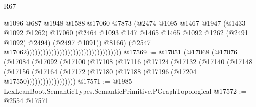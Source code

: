 \begin{lexlean}{R67}
\begin{coremodule}
                                                                          @1096
                                                                          @687
                                                                          @1948
                                                                          @1588
                                                                          @17060
                                                                          @7873
                                                                          (@2474
                                                                            @1095
                                                                            @1467
                                                                            @1947
                                                                            (@1433 @1092 @1262)
                                                                            @17060
                                                                            (@2464
                                                                              @1093
                                                                              @147
                                                                              @1465
                                                                              @1465
                                                                              @1092
                                                                              @1262
                                                                              (@2491 @1092)
                                                                              @2494)
                                                                            (@2497 @1091))
                                                                          @8166)
                                                                        (@2547
                                                                          @17062)))))))))))))))))))))))))))))))))))
@17569 := @17051
    (@17068
      (@17076
        (@17084
          (@17092
            (@17100
              (@17108
                (@17116
                  (@17124
                    (@17132
                      (@17140
                        (@17148
                          (@17156
                            (@17164 (@17172 (@17180 (@17188 (@17196 (@17204 @17550))))))))))))))))))
@17571 := @1985 LexLeanBoot.SemanticTypes.SemanticPrimitive.PGraphTopological
@17572 := @2554 @17571

\end{coremodule}
\end{lexlean}
